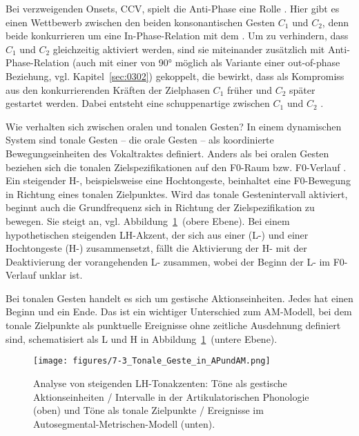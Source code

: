 Bei verzweigenden Onsets, CCV, spielt die Anti-Phase eine Rolle \citep{Nam2009b}. Hier gibt es einen Wettbewerb zwischen den beiden konsonantischen Gesten ${C}_{1}$ und ${C}_{2}$, denn beide konkurrieren um eine In-Phase-Relation mit dem . Um zu verhindern, dass ${C}_{1}$ und ${C}_{2}$ gleichzeitig aktiviert werden, sind sie miteinander zusätzlich mit Anti-Phase-Relation (auch  mit einer  von 90° möglich als Variante einer out-of-phase Beziehung, vgl. Kapitel~\ref{sec:0302}) gekoppelt, die bewirkt, dass als Kompromiss aus den konkurrierenden Kräften der Zielphasen ${C}_{1}$ früher und ${C}_{2}$ später gestartet werden. Dabei entsteht eine schuppenartige  zwischen ${C}_{1}$ und ${C}_{2}$ \citep[;][]{Browman1988, Browman2000, Bombien2010, Gao2009, Goldstein2007a, Goldstein2009, Hermes2008b, Hermes2008b, Nam2007a, Nam2009b, Shaw2009}.

Wie verhalten sich  zwischen oralen und tonalen Gesten? In einem dynamischen System sind tonale Gesten -- die orale Gesten -- als koordinierte Bewegungseinheiten des Vokaltraktes definiert. Anders als bei oralen Gesten beziehen sich die tonalen Zielspezifikationen auf den F0-Raum bzw. F0-Verlauf \citep[vgl.][]{Gao2009, Mücke2009b, Niemann2011, Mücke2012}. Ein steigender H-, beispielsweise eine Hochtongeste, beinhaltet eine F0-Bewegung in Richtung eines tonalen Zielpunktes. Wird das tonale Gestenintervall aktiviert, beginnt auch die Grundfrequenz sich in Richtung der Zielspezifikation zu bewegen. Sie steigt an, vgl. Abbildung~\ref{figure:0703}~(obere Ebene). Bei einem hypothetischen steigenden LH-Akzent, der sich aus einer  (L-) und einer Hochtongeste (H-) zusammensetzt, fällt die Aktivierung der H- mit der Deaktivierung der vorangehenden L- zusammen, wobei der Beginn der L- im F0-Verlauf unklar ist.

Bei tonalen Gesten handelt es sich um gestische Aktionseinheiten. Jedes  hat einen Beginn und ein Ende. Das ist ein wichtiger Unterschied zum AM-Modell, bei dem tonale Zielpunkte als punktuelle Ereignisse ohne zeitliche Ausdehnung definiert sind, schematisiert als L und H in Abbildung~\ref{figure:0703}~(untere Ebene).

\begin{figure}
	\texttt{[image: figures/7-3\_Tonale\_Geste\_in\_APundAM.png]}
	\caption{Analyse von steigenden LH-Tonakzenten: Töne als gestische Aktionseinheiten / Intervalle in der Artikulatorischen Phonologie (oben) und Töne als tonale Zielpunkte / Ereignisse im Autosegmental-Metrischen-Modell (unten).}
	\label{figure:0703}
\end{figure}

